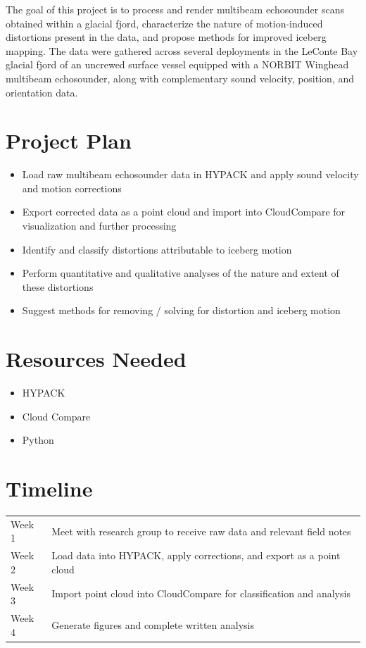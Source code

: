 \documentclass[12pt]{article}
\begin{document}
The goal of this project is to process and render multibeam echosounder scans obtained within a glacial fjord, characterize the nature of motion-induced distortions present in the data, and propose methods for improved iceberg mapping. The data were gathered across several deployments in the LeConte Bay glacial fjord of an uncrewed surface vessel equipped with a NORBIT Winghead multibeam echosounder, along with complementary sound velocity, position, and orientation data.

\section*{Project Plan}
\begin{itemize}
    \item Load raw multibeam echosounder data in HYPACK and apply sound velocity and motion corrections
    \item Export corrected data as a point cloud and import into CloudCompare for visualization and further processing
    \item Identify and classify distortions attributable to iceberg motion
    \item Perform quantitative and qualitative analyses of the nature and extent of these distortions
    \item Suggest methods for removing / solving for distortion and iceberg motion
\end{itemize}

\section*{Resources Needed}
\begin{itemize}
    \item HYPACK
    \item Cloud Compare
    \item Python
\end{itemize}

\section*{Timeline}
\begin{tabular}{ll}
    Week 1 & Meet with research group to receive raw data and relevant field notes \\
    Week 2 & Load data into HYPACK, apply corrections, and export as a point cloud \\
    Week 3 & Import point cloud into CloudCompare for classification and analysis \\
    Week 4 & Generate figures and complete written analysis \\
\end{tabular}
\end{document}
